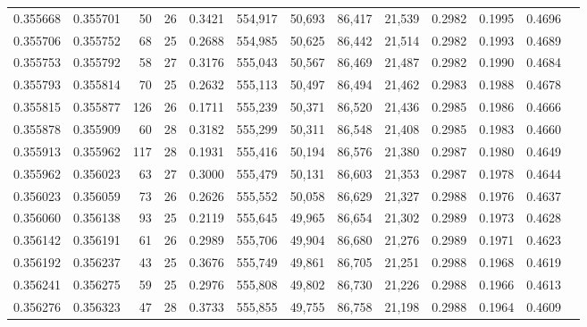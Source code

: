 \begin{tabular}{rrrrrrrrrrrrr}
0.355668 & 0.355701 &    50 &  26 &                                     0.3421 & 554,917 &  50,693 &  86,417 &  21,539 & 0.2982 & 0.1995 & 0.4696 \\
0.355706 & 0.355752 &    68 &  25 &                                     0.2688 & 554,985 &  50,625 &  86,442 &  21,514 & 0.2982 & 0.1993 & 0.4689 \\
0.355753 & 0.355792 &    58 &  27 &                                     0.3176 & 555,043 &  50,567 &  86,469 &  21,487 & 0.2982 & 0.1990 & 0.4684 \\
0.355793 & 0.355814 &    70 &  25 &                                     0.2632 & 555,113 &  50,497 &  86,494 &  21,462 & 0.2983 & 0.1988 & 0.4678 \\
0.355815 & 0.355877 &   126 &  26 &                                     0.1711 & 555,239 &  50,371 &  86,520 &  21,436 & 0.2985 & 0.1986 & 0.4666 \\
0.355878 & 0.355909 &    60 &  28 &                                     0.3182 & 555,299 &  50,311 &  86,548 &  21,408 & 0.2985 & 0.1983 & 0.4660 \\
0.355913 & 0.355962 &   117 &  28 &                                     0.1931 & 555,416 &  50,194 &  86,576 &  21,380 & 0.2987 & 0.1980 & 0.4649 \\
0.355962 & 0.356023 &    63 &  27 &                                     0.3000 & 555,479 &  50,131 &  86,603 &  21,353 & 0.2987 & 0.1978 & 0.4644 \\
0.356023 & 0.356059 &    73 &  26 &                                     0.2626 & 555,552 &  50,058 &  86,629 &  21,327 & 0.2988 & 0.1976 & 0.4637 \\
0.356060 & 0.356138 &    93 &  25 &                                     0.2119 & 555,645 &  49,965 &  86,654 &  21,302 & 0.2989 & 0.1973 & 0.4628 \\
0.356142 & 0.356191 &    61 &  26 &                                     0.2989 & 555,706 &  49,904 &  86,680 &  21,276 & 0.2989 & 0.1971 & 0.4623 \\
0.356192 & 0.356237 &    43 &  25 &                                     0.3676 & 555,749 &  49,861 &  86,705 &  21,251 & 0.2988 & 0.1968 & 0.4619 \\
0.356241 & 0.356275 &    59 &  25 &                                     0.2976 & 555,808 &  49,802 &  86,730 &  21,226 & 0.2988 & 0.1966 & 0.4613 \\
0.356276 & 0.356323 &    47 &  28 &                                     0.3733 & 555,855 &  49,755 &  86,758 &  21,198 & 0.2988 & 0.1964 & 0.4609 \\

\end{tabular}
